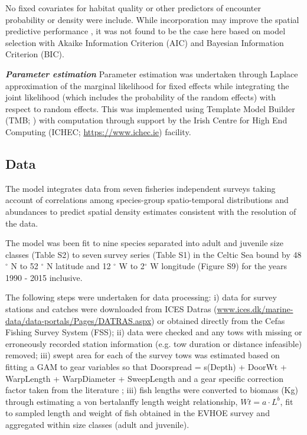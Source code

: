 \documentclass{nature}
\begin{document}
\begin{linenumbers}
No fixed covariates for habitat quality or other predictors of encounter
probability or density were include. While incorporation may improve the
spatial predictive performance \cite{Thorson2017}, it was not found to be the
case here based on model selection with Akaike Information Criterion (AIC) and
Bayesian Information Criterion (BIC).

\textbf{\textit{Parameter estimation}} Parameter estimation was undertaken
through Laplace approximation of the marginal likelihood for fixed effects
while integrating the joint likelihood (which includes the probability of the
random effects) with respect to random effects. This was implemented using
Template Model Builder (TMB; \cite{Kristensen2015}) with computation through
support by the Irish Centre for High End Computing (ICHEC;
\url{https://www.ichec.ie}) facility.  

\subsection{Data}

The model integrates data from seven fisheries independent surveys taking
account of correlations among species-group spatio-temporal distributions and
abundances to predict spatial density estimates consistent with the resolution
of the data. 

The model was been fit to nine species separated into adult and juvenile size
classes (Table S2) to seven survey series (Table S1) in the Celtic Sea bound by
48$^{\circ}$ N to 52 $^{\circ}$ N latitude and 12 $^{\circ}$ W to 2$^{\circ}$ W
longitude (Figure S9) for the years 1990 - 2015 inclusive. 

The following steps were undertaken for data processing: i) data for survey
stations and catches were downloaded from ICES Datras
(\url{www.ices.dk/marine-data/data-portals/Pages/DATRAS.aspx}) or obtained
directly from the Cefas Fishing Survey System (FSS); ii) data were checked and
any tows with missing or erroneously recorded station information (e.g. tow
duration or distance infeasible) removed; iii) swept area for each of the
survey tows was estimated based on fitting a GAM to gear variables so that
Doorspread = s(Depth) + DoorWt + WarpLength + WarpDiameter + SweepLength and a
gear specific correction factor taken from the literature \cite{Piet2009}; iii)
fish lengths were converted to biomass (Kg) through estimating a von
bertalanffy length weight relationship, $Wt = a \cdot L^{b}$, fit to sampled
length and weight of fish obtained in the EVHOE survey and aggregated within
size classes (adult and juvenile). 


\end{linenumbers}
\end{document}
